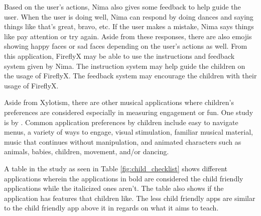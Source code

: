 Based on the user's actions, Nima also gives some feedback to help guide the user. When the user is doing well, Nima can respond by doing dances and saying things like that's great, bravo, etc. If the user makes a mistake, Nima says things like pay attention or try again. Aside from these responses, there are also emojis showing happy faces or sad faces depending on the user's actions as well. From this application, FireflyX may be able to use the instructions and feedback system given by Nima. The instruction system may help guide the children on the usage of FireflyX. The feedback system may encourage the children with their usage of FireflyX.



Aside from Xylotism, there are other musical applications where children’s preferences are considered especially in measuring engagement or fun. One study is by . Common application preferences by children include easy to navigate menus, a variety of ways to engage, visual stimulation, familiar musical material, music that continues without manipulation, and animated characters such as animals, babies, children, movement, and/or dancing.

A table in the study as seen in Table \ref{fig:child_checklist} shows different applications wherein the applications in bold are considered the child friendly applications while the italicized ones aren’t. The table also shows if the application has features that children like. The less child friendly apps are similar to the child friendly app above it in regards on what it aims to teach. 


